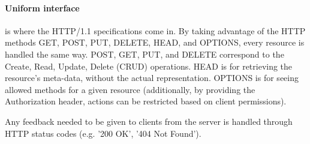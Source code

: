 \paragraph{Uniform interface} is where the HTTP/1.1 specifications come in.
By taking advantage of the HTTP methods GET, POST, PUT, DELETE, HEAD, and OPTIONS, every resource is handled the same way.
POST, GET, PUT, and DELETE correspond to the Create, Read, Update, Delete (CRUD) operations.
HEAD is for retrieving the resource's meta-data, without the actual representation.
OPTIONS is for seeing allowed methods for a given resource (additionally, by providing the Authorization header, actions can be restricted based on client permissions).

Any feedback needed to be given to clients from the server is handled through HTTP status codes (e.g. '200 OK', '404 Not Found').
